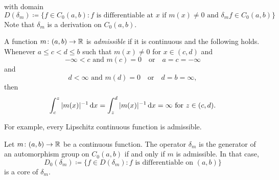 with domain  
\[
D(\delta_{m}) \coloneq \{ f \in C_{0}(a,b) \colon f \text{ is differentiable at } x \text{ if } m(x) \neq 0 \text{ and } \delta_{m}f \in C_{0}(a,b) \}
\]
Note that $\delta_{m}$ is a derivation on $C_{0}(a,b)$.
\begin{definition}\label{def:b2-3.16}
%
A function $m \colon (a,b) \to \mathbb{R}$ is \emph{admissible} if it is continuous and the following holds.
Whenever $a \leq c < d \leq b$ such that $m(x) \neq 0$ for $x \in (c,d)$ and 
\[
 -\infty < c \text{ and } m(c) = 0
\quad \text{or} \quad
a = c = -\infty
\]
and
\[
d < \infty \text{ and } m(d) = 0
\quad \text{or} \quad
d = b = \infty, 
\]
then
\begin{equation*}\label{eq:b2-3.16-KGK.1}
\int_{c}^{z} |m(x)|^{-1} \mathop{}\!\mathrm{d}{x} = \int_{z}^{d} |m(x)|^{-1} \mathop{}\!\mathrm{d}{x} 
	= \infty \text{ for } z \in (c,d).
\end{equation*}
\end{definition}
For example, every Lipschitz continuous function is admissible.
%
\begin{theorem}\label{thm:b2-3.17}
Let $m \colon (a,b) \to \mathbb{R}$ be a continuous function. The operator $\delta_{m}$
is the generator of an automorphism group on $C_{0}(a,b)$ if and only if\/ $m$
is admissible. In that case,
\[
    D_{0}(\delta_{m}) \coloneq \{ f \in D(\delta_{m}) \colon f \text{ is differentiable on } (a,b)\}
\]
is a core of\/ $\delta_{m}$.
\end{theorem}
